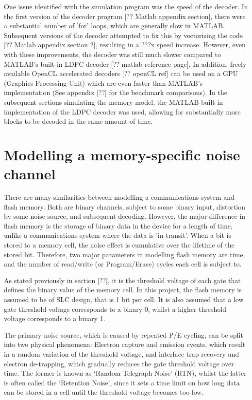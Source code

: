 \documentclass[11pt]{article}
\numberwithin{equation}{subsection}
\begin{document}
One issue identified with the simulation program was the speed of the decoder. In the first version of the decoder program [?? Matlab appendix section], there were a substantial number of 'for' loops, which are generally slow in MATLAB. Subsequent versions of the decoder attempted to fix this by vectorising the code [?? Matlab appendix section 2], resulting in a ???x speed increase. However, even with these improvements, the decoder was still much slower compared to MATLAB's built-in LDPC decoder [?? matlab reference page]. In addition, freely available OpenCL accelerated decoders [?? openCL ref] can be used on a GPU (Graphics Processing Unit) which are even faster than MATLAB's implementation (See appendix [??] for the benchmark comparisons). In the subsequent sections simulating the memory model, the MATLAB built-in implementation of the LDPC decoder was used, allowing for substantially more blocks to be decoded in the same amount of time.

\section{Modelling a memory-specific noise channel}
There are many similarities between modelling a communications system and flash memory. Both are binary channels, subject to some binary input, distortion by some noise source, and subsequent decoding. However, the major difference in flash memory is the storage of binary data in the device for a length of time, unlike a communications system where the data is 'in transit'. When a bit is stored to a memory cell, the noise effect is cumulative over the lifetime of the stored bit. Therefore, two major parameters in modelling flash memory are time, and the number of read/write (or Program/Erase) cycles each cell is subject to.

As stated previously in section [??], it is the threshold voltage of each gate that defines the binary value of the memory cell. In this project, the flash memory is assumed to be of SLC design, that is 1 bit per cell. It is also assumed that a low gate threshold voltage corresponds to a binary 0, whilst a higher threshold voltage corresponds to a binary 1. 

The primary noise source, which is caused by repeated P/E cycling, can be split into two physical phenomena: Electron capture and emission events, which result in a random variation of the threshold voltage, and interface trap recovery and electron de-trapping, which gradually reduces the gate threshold voltage over time. The former is known as `Random Telegraph Noise' (RTN), whilst the latter is often called the `Retention Noise', since it sets a time limit on how long data can be stored in a cell until the threshold voltage becomes too low.
\end{document}
